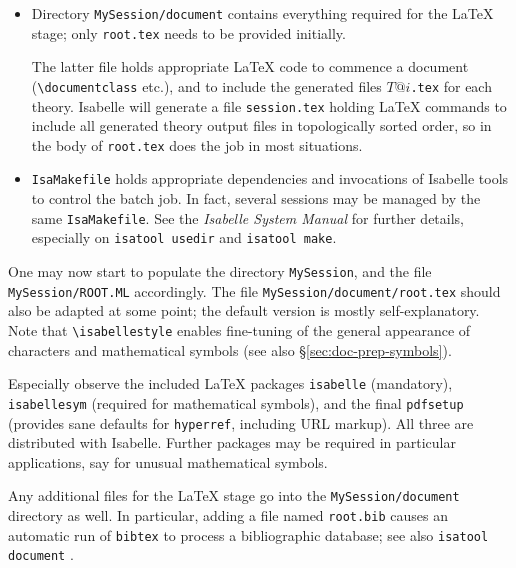 \begin{isabellebody}
\begin{isamarkuptext}
\begin{itemize}
  \item Directory \texttt{MySession/document} contains everything
  required for the {\LaTeX} stage; only \texttt{root.tex} needs to be
  provided initially.

  The latter file holds appropriate {\LaTeX} code to commence a
  document (\verb,\documentclass, etc.), and to include the generated
  files $T@i$\texttt{.tex} for each theory.  Isabelle will generate a
  file \texttt{session.tex} holding {\LaTeX} commands to include all
  generated theory output files in topologically sorted order, so
  \verb,, in the body of \texttt{root.tex} does the job
  in most situations.

  \item \texttt{IsaMakefile} holds appropriate dependencies and
  invocations of Isabelle tools to control the batch job.  In fact,
  several sessions may be managed by the same \texttt{IsaMakefile}.
  See the \emph{Isabelle System Manual} \cite{isabelle-sys} 
  for further details, especially on
  \texttt{isatool usedir} and \texttt{isatool make}.

  \end{itemize}

  One may now start to populate the directory \texttt{MySession}, and
  the file \texttt{MySession/ROOT.ML} accordingly.  The file
  \texttt{MySession/document/root.tex} should also be adapted at some
  point; the default version is mostly self-explanatory.  Note that
  \verb,\isabellestyle, enables fine-tuning of the general appearance
  of characters and mathematical symbols (see also
  \S\ref{sec:doc-prep-symbols}).

  Especially observe the included {\LaTeX} packages \texttt{isabelle}
  (mandatory), \texttt{isabellesym} (required for mathematical
  symbols), and the final \texttt{pdfsetup} (provides sane defaults
  for \texttt{hyperref}, including URL markup).  All three are
  distributed with Isabelle. Further packages may be required in
  particular applications, say for unusual mathematical symbols.

  \medskip Any additional files for the {\LaTeX} stage go into the
  \texttt{MySession/document} directory as well.  In particular,
  adding a file named \texttt{root.bib} causes an automatic run of
  \texttt{bibtex} to process a bibliographic database; see also
  \texttt{isatool document} \cite{isabelle-sys}.


\end{isamarkuptext}
\end{isabellebody}
